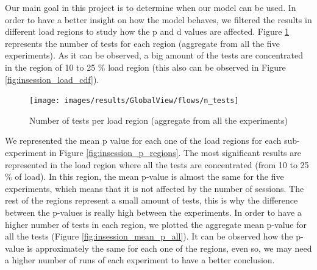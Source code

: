 Our main goal in this project is to determine when our model can be used. In order to have a better insight on how the model behaves, we filtered the results in different load regions to study how the p and d values are affected. Figure \ref{fig:insession_regions_n_tests} represents the number of tests for each region (aggregate from all the five experiments). As it can be observed, a big amount of the tests are concentrated in the region of 10 to 25 \% load region (this also can be observed in Figure \ref{fig:insession_load_cdf}).

\begin{figure}[h!]
	\centering
	\texttt{[image: images/results/GlobalView/flows/n\_tests]}
	\caption{Number of tests per load region (aggregate from all the experiments)}
	\label{fig:insession_regions_n_tests}
\end{figure}

We represented the mean p value for each one of the load regions for each sub-experiment in Figure \ref{fig:insession_p_regions}. The most significant results are represented in the load region where all the tests are concentrated (from 10 to 25 \% of load). In this region, the mean p-value is almost the same for the five experiments, which means that it is not affected by the number of sessions. The rest of the regions represent a small amount of tests, this is why the difference between the p-values is really high between the experiments. In order to have a higher number of tests in each region, we plotted the aggregate mean p-value for all the tests (Figure \ref{fig:insession_mean_p_all}). It can be observed how the p-value is approximately the same for each one of the regions, even so, we may need a higher number of runs of each experiment to have a better conclusion.

